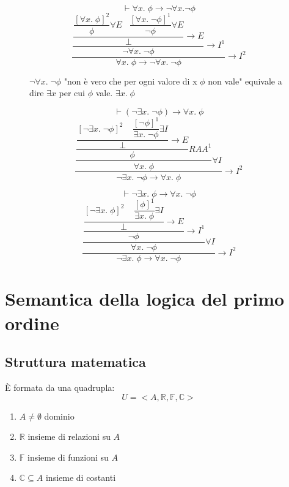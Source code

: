 \documentclass{article}
\theoremstyle{break}
\theoremstyle{break}
\theoremstyle{break}
\theoremstyle{break}
\begin{document}
\begin{figure}[H]
  \begin{exercise}
    \[
    \vdash \forall x.\; \phi \to \neg \forall x. \neg \phi
    \]
    \[
      \dfrac{\dfrac{\dfrac{\dfrac{[\forall x.\; \phi]^2}{\phi} \forall E \;\;\; \dfrac{[\forall x.\; \neg \phi]^1}{\neg \phi} \forall E}{\bot} \to E}{\neg \forall x.\; \neg \phi}\to I^1}{\forall x.\; \phi \to  \neg \forall x.\; \neg \phi} \to I^2
    \] 

    \( \neg \forall x.\; \neg \phi \) "non è vero che per ogni valore di x \( \phi \) non vale" equivale a dire
    \( \exists x \) per cui \( \phi \) vale. \( \exists x. \;\phi \) 
  \end{exercise}
\end{figure}

\begin{figure}[H]
  \begin{exercise}
    \[
    \vdash (\neg \exists x.\; \neg \phi) \to \forall x.\; \phi
    \] 
    \[
      \dfrac{\dfrac{\dfrac{\dfrac{[\neg \exists x.\; \neg \phi]^2 \;\;\;\;\dfrac{[\neg \phi]^1}{\exists x.\; \neg \phi} \scriptstyle\exists I}{\bot} \scriptstyle\to E}{\phi} \scriptstyle RAA^1}{\forall x.\; \phi} \scriptstyle\forall I}{\neg \exists x.\; \neg \phi \to \forall x.\; \phi} \scriptstyle\to I^2
    \] 
  \end{exercise}
\end{figure}

\begin{figure}[H]
  \begin{exercise}
    \[
    \vdash \neg \exists x.\; \phi \to \forall x.\; \neg \phi
    \] 
    \[
      \dfrac{\dfrac{\dfrac{\dfrac{[\neg \exists x.\; \phi]^2 \;\;\;\;\dfrac{[\phi]^1}{\exists x.\;\phi} \scriptstyle\exists I}{\bot}\scriptstyle\to E}{\neg \phi} \scriptstyle\to I^1}{\forall x.\; \neg \phi}\scriptstyle\forall I}{\neg \exists x.\; \phi \to \forall x.\; \neg \phi} \scriptstyle\to I^2
    \] 
  \end{exercise}
\end{figure}

\section{Semantica della logica del primo ordine}
\subsection{Struttura matematica}
È formata da una quadrupla:
\[
U = <A, \mathbb{R}, \mathbb{F}, \mathbb{C}>
\]  
\begin{enumerate}
  \item \( A \neq \emptyset \) dominio
  \item \( \mathbb{R} \) insieme di relazioni su \( A \) 
  \item \( \mathbb{F} \) insieme di funzioni su \( A \)
  \item \( \mathbb{C} \subseteq A \) insieme di costanti
\end{enumerate}
\end{document}
